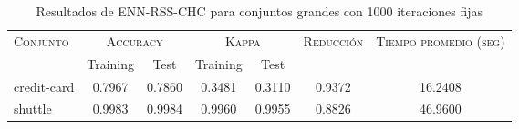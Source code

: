 \begin{table}[]
\centering
\begin{tabular}{l c c c c c c}
\hline
\multirow{2}{*}{\textsc{Conjunto}}
	& \multicolumn{2}{c}{\textsc{Accuracy}}
	& \multicolumn{2}{c}{\textsc{Kappa}}
	& \textsc{Reducción}
	& \textsc{Tiempo promedio (seg)} \\
	& Training & Test
	& Training & Test \\ 
\hline
\hline

credit-card & 0.7967 & 0.7860 & 0.3481 & 0.3110 & 0.9372 & 16.2408 \\
shuttle & 0.9983 & 0.9984 & 0.9960 & 0.9955 & 0.8826 & 46.9600 \\

\hline
\end{tabular}
\caption{Resultados de ENN-RSS-CHC para conjuntos grandes con 1000 iteraciones fijas}
\label{res-grande-ENN-RSS-CHC}
\end{table}